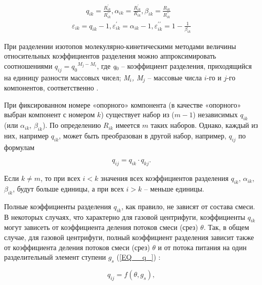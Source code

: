 \begin{equation} \label{EQ__1_11_} 
  \begin{array}{l}
    \qquad q_{i k}=\frac{R_{i k}^{\prime}}{R_{i k}^{\prime \prime}}, \alpha_{i k}=\frac{R_{i k}^{\prime}}{R_{i k}}, \beta_{i k}=\frac{R_{i k}}{R_{i k}^{\prime \prime}} \\
    \varepsilon_{i k}=q_{i k}-1, \varepsilon_{i k}^{\prime}=\alpha_{i k}-1, \varepsilon_{i k}^{\prime \prime}=1-\frac{1}{\beta_{i k}}
    \end{array}
\end{equation} 

При разделении изотопов молекулярно-кинетическими методами величины относительных коэффициентов разделения можно аппроксимировать соотношениями $q_{ij} =q_{0} {}^{M_{j} -M_{i} }$, где \textit{q}${}_{0}$ – коэффициент разделения, приходящийся на единицу разности массовых чисел; \textit{M${}_{i}$, M${}_{j}$} – массовые числа $i$-го и $j$-го компонентов, соответственно \cite{sulaberidzeTeoriyaKaskadovDlya2011}.

При фиксированном номере «опорного» компонента (в качестве «опорного» выбран компонент с номером $k$) существует набор из ($m-1$) независимых $q_{ik} $ (или $\alpha _{ik} $, $\beta _{ik}$). По определению $R_{ik} $ имеется $m$ таких наборов. Однако, каждый из них, например $q_{ik}$, может быть преобразован в другой набор, например, $q_{ij}$ по формулам

\begin{equation} \label{EQ__1_12_} 
  q_{ij} =q_{ik} \cdot q_{kj} .            
\end{equation} 

Если $k\ne m$, то при всех $i<k$ значения всех коэффициентов разделения $q_{ik} $, $\alpha _{ik} $, $\beta _{ik} $, будут больше единицы, а при всех $i>k$ -- меньше единицы.

Полные коэффициенты разделения $q_{ik} $, как правило, не зависят от состава смеси. В некоторых случаях, что характерно для газовой центрифуги, коэффициенты $q_{ik} $ могут зависеть от коэффициента деления потоков смеси (срез) $\theta $. Так, в общем случае, для газовой центрифуги, полный коэффициент разделения зависит также от коэффициента деления потоков смеси (срез) $\theta$ и от потока питания на один разделительный элемент ступени $g_{s} $ (\ref{EQ__q_}) \cite{mustafinObjectiveFunctionOptimization2019}:

\begin{equation} \label{EQ__q_} 
  q_{ij} = f(\theta, g_{s}),              
\end{equation}


